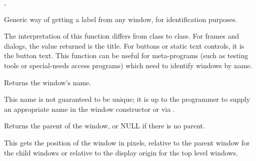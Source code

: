 
,\rtfsp
{}



Generic way of getting a label from any window, for
identification purposes.


The interpretation of this function differs from class to class.
For frames and dialogs, the value returned is the title. For buttons or static text controls, it is
the button text. This function can be useful for meta-programs (such as testing
tools or special-needs access programs) which need to identify windows
by name.

\label{wxwindowgetname}


Returns the window's name.


This name is not guaranteed to be unique; it is up to the programmer to supply an appropriate
name in the window constructor or via .





Returns the parent of the window, or NULL if there is no parent.

\label{wxwindowgetposition}



This gets the position of the window in pixels, relative to the parent window
for the child windows or relative to the display origin for the top level
windows.




